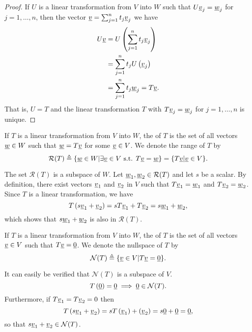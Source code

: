 \begin{proof}
If $U$ is a linear transformation from $V$ into $W$ such that $U \underline{v}_j = \underline{w}_j$ for $j = 1, \ldots, n$, then the vector $\underline{v} = \sum_{j=1}^n t_j \underline{v}_j$ we have
\begin{equation*}
\begin{split}
U \underline{v} &= U \left( \sum_{j=1}^n t_j \underline{v}_j \right) \\
&= \sum_{j=1}^n t_j U \left( \underline{v}_j \right) \\
&= \sum_{j=1}^n t_j \underline{w}_j
= T \underline{v} .
\end{split}
\end{equation*}
That is, $U = T$ and the linear transformation $T$ with $T \underline{v}_j = \underline{w}_j$ for $j = 1, \ldots, n$ is unique.
\end{proof}
\fi

\begin{definition}
If $T$ is a linear transformation from $V$ into $W$, the  of $T$ is the set of all vectors $\underline{w} \in W$ such that $\underline{w} = T \underline{v}$ for some $\underline{v} \in V$.
We denote the range of $T$ by
\[ \mathcal{R}(T) \triangleq \{ \underline{w}\in W | \exists \underline{v}\in V \textrm{ s.t. } T\underline{v} = \underline{w} \} = \{ T \underline{v} | \underline{v} \in V\}. \]
\end{definition}
The set $\mathcal{R}(T)$ is a subspace of $W$.
Let $\underline{w}_1, \underline{w}_2 \in \mathcal{R}(T)$ and let $s$ be a scalar.
By definition, there exist vectors $\underline{v}_1$ and $\underline{v}_2$ in $V$ such that $T \underline{v}_1 = \underline{w}_1$ and $T \underline{v}_2 = \underline{w}_2$.
Since $T$ is a linear transformation, we have
\begin{equation*}
T \left( s \underline{v}_1 + \underline{v}_2 \right) = s T \underline{v}_1 + T \underline{v}_2 = s \underline{w}_1 + \underline{w}_2 ,
\end{equation*}
which shows that $s \underline{w}_1 + \underline{w}_2$ is also in $\mathcal{R}(T)$.

\begin{definition}
If $T$ is a linear transformation from $V$ into $W$, the  of $T$ is the set of all vectors $\underline{v} \in V$ such that $T \underline{v} = \underline{0}$.
We denote the nullspace of $T$ by
\[ \mathcal{N}(T) \triangleq \{ \underline{v}\in V | T \underline{v} = \underline{0} \} .\]
\end{definition}
It can easily be verified that $\mathcal{N}(T)$ is a subspace of $V$.
\begin{equation*}
T \left( \underline{0} \right) = \underline{0} \implies \underline{0} \in \mathcal{N}(T).
\end{equation*}
Furthermore, if $T \underline{v}_1 = T \underline{v}_2 = 0$ then
\begin{equation*}
T \left( s \underline{v}_1 + \underline{v}_2 \right) = s T \left( \underline{v}_1 \right) + \left( \underline{v}_2 \right) = s \underline{0} + \underline{0} = \underline{0} ,
\end{equation*}
so that $s \underline{v}_1 + \underline{v}_2 \in \mathcal{N}(T)$.

